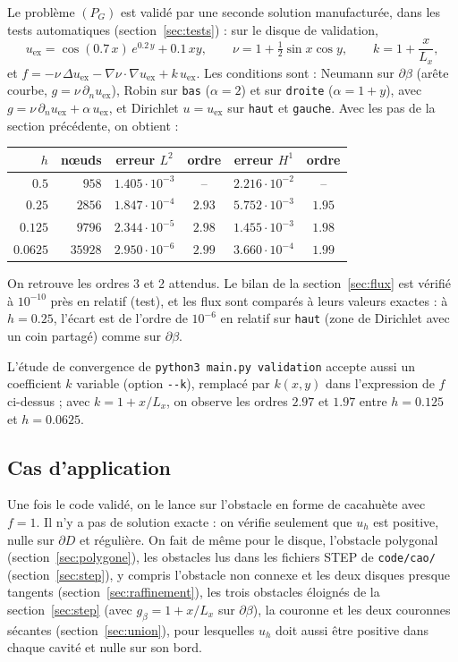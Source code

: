 \documentclass[11pt,a4paper]{article}
\begin{document}
Le problème $(P_G)$ est validé par une seconde solution manufacturée, dans les
tests automatiques (section~\ref{sec:tests}) : sur le disque de validation,
\[
u_{\mathrm{ex}} = \cos(0.7\, x)\, e^{0.2\, y} + 0.1\, x y,
\qquad
\nu = 1 + \tfrac12 \sin x \cos y,
\qquad
k = 1 + \frac{x}{L_x},
\]
et $f = -\nu\, \Delta u_{\mathrm{ex}} - \nabla\nu \cdot \nabla u_{\mathrm{ex}}
+ k\, u_{\mathrm{ex}}$. Les conditions sont : Neumann sur $\partial\beta$
(arête courbe, $g = \nu\, \partial_n u_{\mathrm{ex}}$), Robin sur
\texttt{bas} ($\alpha = 2$) et sur \texttt{droite} ($\alpha = 1 + y$), avec
$g = \nu\, \partial_n u_{\mathrm{ex}} + \alpha\, u_{\mathrm{ex}}$, et Dirichlet
$u = u_{\mathrm{ex}}$ sur \texttt{haut} et \texttt{gauche}. Avec les pas de
la section précédente, on obtient :
\begin{center}
\begin{tabular}{rrcccc}
\hline
$h$ & nœuds & erreur $L^2$ & ordre & erreur $H^1$ & ordre \\
\hline
$0.5$    & $958$   & $1.405 \cdot 10^{-3}$ & -- & $2.216 \cdot 10^{-2}$ & -- \\
$0.25$   & $2856$  & $1.847 \cdot 10^{-4}$ & $2.93$ & $5.752 \cdot 10^{-3}$ & $1.95$ \\
$0.125$  & $9796$  & $2.344 \cdot 10^{-5}$ & $2.98$ & $1.455 \cdot 10^{-3}$ & $1.98$ \\
$0.0625$ & $35928$ & $2.950 \cdot 10^{-6}$ & $2.99$ & $3.660 \cdot 10^{-4}$ & $1.99$ \\
\hline
\end{tabular}
\end{center}
On retrouve les ordres 3 et 2 attendus. Le bilan de la
section~\ref{sec:flux} est vérifié à $10^{-10}$ près en relatif (test), et les
flux sont comparés à leurs valeurs exactes : à $h = 0.25$, l'écart est de
l'ordre de $10^{-6}$ en relatif sur \texttt{haut} (zone de Dirichlet avec un
coin partagé) comme sur $\partial\beta$.

L'étude de convergence de \texttt{python3 main.py validation} accepte aussi un
coefficient $k$ variable (option \texttt{-{}-k}), remplacé par $k(x,y)$ dans
l'expression de $f$ ci-dessus ; avec $k = 1 + x/L_x$, on observe les ordres
$2.97$ et $1.97$ entre $h = 0.125$ et $h = 0.0625$.

\subsection{Cas d'application}

Une fois le code validé, on le lance sur l'obstacle en forme de cacahuète
avec $f = 1$. Il n'y a pas de solution exacte : on vérifie seulement que
$u_h$ est positive, nulle sur $\partial D$ et régulière. On fait de même pour
le disque, l'obstacle polygonal (section~\ref{sec:polygone}), les obstacles
lus dans les fichiers STEP de \texttt{code/cao/} (section~\ref{sec:step}), y
compris l'obstacle non connexe et les deux disques presque tangents
(section~\ref{sec:raffinement}), les trois obstacles éloignés de la
section~\ref{sec:step} (avec $g_\beta = 1 + x / L_x$ sur $\partial\beta$),
la couronne et les deux couronnes sécantes (section~\ref{sec:union}), pour
lesquelles $u_h$ doit aussi être positive dans chaque cavité et nulle sur son
bord.
\end{document}
